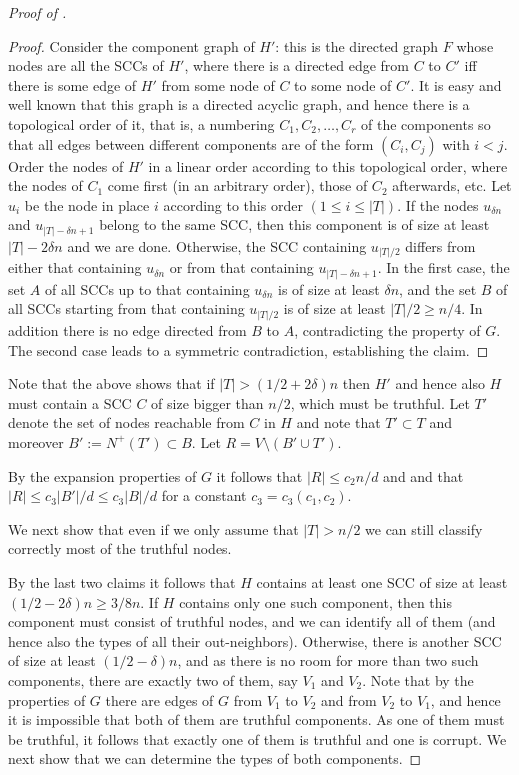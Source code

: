 \documentclass{toc}
\begin{document}
\begin{proof}[Proof of ]
\begin{proof} Consider the component graph of $H'$: this is the 
directed graph $F$ whose nodes are all the SCCs of 
$H'$, where there is a directed 
edge  from $C$ to $C'$ iff there is some edge of  $H'$ from
some node of $C$ to some node of $C'$.  It is easy and well
known that this graph is a directed acyclic graph, and hence there
is a topological order of it, that is, a numbering
$C_1, C_2, \ldots ,C_r$ of the components  so that all edges
between different components  are of the form $(C_i,C_j)$ with
$i <j$. Order the nodes of $H'$ in a linear order according to
this topological order, where the nodes of $C_1$ come first
(in an arbitrary order),
those of $C_2$ afterwards, etc. Let $u_i$ be the node in place
$i$ according to this order $(1 \leq i \leq |T|)$. If the
nodes $u_{\delta n}$ and $u_{|T|-\delta n+1}$ 
belong to the same SCC, then this component is of size
at least $|T|-2 \delta n$ and we are done. Otherwise, the SCC
containing $u_{|T|/2}$ differs from either that containing
$u_{\delta n}$ or from that containing $u_{|T|-\delta n+1}$.
In the first case, the set $A$ of all SCCs up to that  containing
$u_{\delta n}$ is of size  at least $\delta n$, and the set
$B$ of all SCCs starting from that containing $u_{|T|/2}$ 
is of size at least $|T|/2 \geq n/4$. In addition there is no edge directed
from $B$ to $A$, contradicting the property of $G$. The second case
leads to a symmetric contradiction, establishing the claim.
\end{proof}

Note that the above shows that if $|T|>(1/2+2\delta)n$ then
$H'$ and hence also $H$ must contain a SCC $C$ of size bigger than
$n/2$, which must be truthful.  Let $T'$ denote the set of nodes
reachable from $C$ in $H$ and note that $T' \subset T$ and moreover
$B' := N^{+}(T') \subset B$.
Let  $R = V \setminus (B' \cup T')$. 

By the expansion properties of $G$ it follows that 
$|R| \leq c_2 n / d$ and 
and that $|R| \leq c_3 |B'|/d \leq c_3 |B|/d$ 
for a constant $c_3=c_3(c_1,c_2)$. 

We next show that even if we only
assume that $|T|>n/2$ we can still classify correctly most of the
truthful nodes. 

By the last two claims it follows that $H$ contains at least one
SCC of size at least $(1/2-2 \delta)n \geq 3/8 n$.
If $H$ contains only one such component, then this component  
must consist of truthful nodes, and we can identify all of them
(and hence also the types of all their out-neighbors). 
Otherwise, there is another SCC of size at least
$(1/2-\delta)n$, and as there is no room for more than two such
components, there are exactly two of them, say $V_1$ and $V_2$. Note
that by the properties of $G$ there are edges of $G$ from $V_1$
to $V_2$ and from $V_2$ to $V_1$, 
and hence it is impossible that both of them are
truthful components.  As one of them must be truthful, it follows
that exactly one  of them is truthful  and one is corrupt.
We next show that we can determine the types of both
components.


\end{proof}
\end{document}
